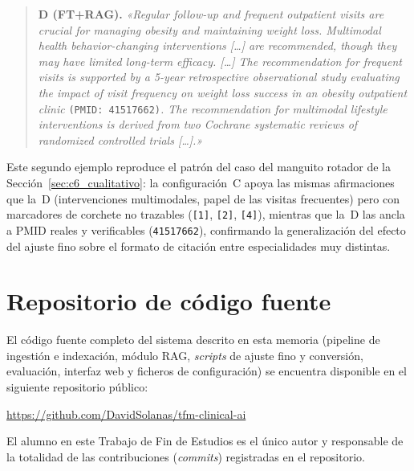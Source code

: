 \documentclass[11pt,a4paper,spanish]{book}
\numberwithin{equation}{chapter}
\numberwithin{figure}{chapter}
\begin{document}
\begin{quote}\small
\textbf{D (FT+RAG).} \emph{«Regular follow-up and frequent outpatient visits are crucial for managing obesity and maintaining weight loss. Multimodal health behavior-changing interventions [\ldots] are recommended, though they may have limited long-term efficacy. [\ldots] The recommendation for frequent visits is supported by a 5-year retrospective observational study evaluating the impact of visit frequency on weight loss success in an obesity outpatient clinic} \texttt{(PMID: 41517662)}\emph{. The recommendation for multimodal lifestyle interventions is derived from two Cochrane systematic reviews of randomized controlled trials [\ldots].»}
\end{quote}

Este segundo ejemplo reproduce el patrón del caso del manguito rotador de la Sección~\ref{sec:c6_cualitativo}: la configuración~C apoya las mismas afirmaciones que la~D (intervenciones multimodales, papel de las visitas frecuentes) pero con marcadores de corchete no trazables (\texttt{[1]}, \texttt{[2]}, \texttt{[4]}), mientras que la~D las ancla a PMID reales y verificables (\texttt{41517662}), confirmando la generalización del efecto del ajuste fino sobre el formato de citación entre especialidades muy distintas.

\chapter{Repositorio de código fuente}
\label{anexo:repo}

El código fuente completo del sistema descrito en esta memoria (pipeline de ingestión e indexación, módulo RAG, \textit{scripts} de ajuste fino y conversión, evaluación, interfaz web y ficheros de configuración) se encuentra disponible en el siguiente repositorio público:

\begin{center}
\url{https://github.com/DavidSolanas/tfm-clinical-ai}
\end{center}

El alumno en este Trabajo de Fin de Estudios es el único autor y responsable de la totalidad de las contribuciones (\textit{commits}) registradas en el repositorio.
\end{document}
